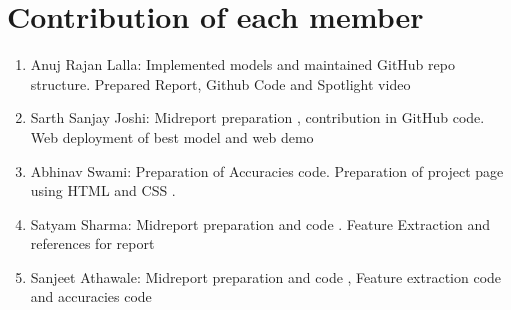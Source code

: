 \documentclass[a4paper]{article}
\theoremstyle{plain}
\theoremstyle{definition}
\begin{document}
	\section{Contribution of each member}
	\label{sec:contribution}
	\begin{enumerate}
	\item Anuj Rajan Lalla: Implemented models and maintained GitHub repo structure. Prepared Report, Github Code and Spotlight video
	\item Sarth Sanjay Joshi: Midreport preparation , contribution in GitHub code. Web deployment of best model and web demo
 \item Abhinav Swami: Preparation of Accuracies code. Preparation of project page using HTML and CSS . 
	\item Satyam Sharma: Midreport preparation and code . Feature Extraction and references for report
 \item Sanjeet Athawale: Midreport preparation and code , Feature extraction code and accuracies code

	
	\end{enumerate}
    	
	
\end{document}
